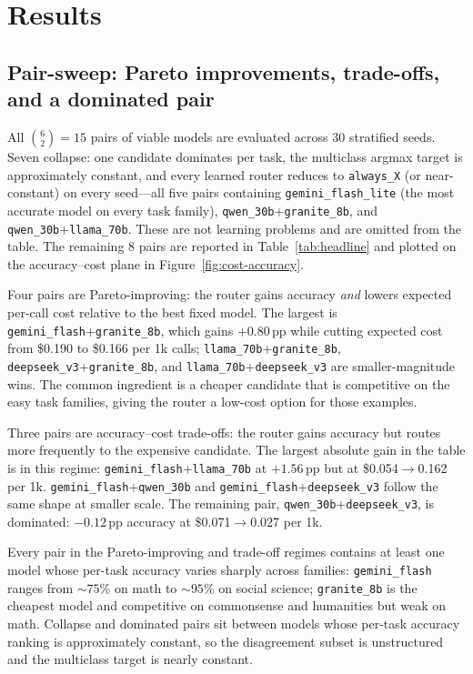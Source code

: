 \documentclass[11pt]{article}
\begin{document}
\section{Results}

\subsection{Pair-sweep: Pareto improvements, trade-offs, and a dominated pair}
\label{sec:pair-sweep}
All $\binom{6}{2}=15$ pairs of viable models are evaluated across 30 stratified seeds. Seven collapse: one candidate dominates per task, the multiclass argmax target is approximately constant, and every learned router reduces to \texttt{always\_X} (or near-constant) on every seed---all five pairs containing \texttt{gemini\_flash\_lite} (the most accurate model on every task family), \texttt{qwen\_30b}+\texttt{granite\_8b}, and \texttt{qwen\_30b}+\texttt{llama\_70b}. These are not learning problems and are omitted from the table. The remaining 8 pairs are reported in Table~\ref{tab:headline} and plotted on the accuracy--cost plane in Figure~\ref{fig:cost-accuracy}.

Four pairs are Pareto-improving: the router gains accuracy \emph{and} lowers expected per-call cost relative to the best fixed model. The largest is \texttt{gemini\_flash}+\texttt{granite\_8b}, which gains $+0.80$\,pp while cutting expected cost from \$0.190 to \$0.166 per 1k calls; \texttt{llama\_70b}+\texttt{granite\_8b}, \texttt{deepseek\_v3}+\texttt{granite\_8b}, and \texttt{llama\_70b}+\texttt{deepseek\_v3} are smaller-magnitude wins. The common ingredient is a cheaper candidate that is competitive on the easy task families, giving the router a low-cost option for those examples.

Three pairs are accuracy--cost trade-offs: the router gains accuracy but routes more frequently to the expensive candidate. The largest absolute gain in the table is in this regime: \texttt{gemini\_flash}+\texttt{llama\_70b} at $+1.56$\,pp but at \$0.054$\to$0.162 per 1k. \texttt{gemini\_flash}+\texttt{qwen\_30b} and \texttt{gemini\_flash}+\texttt{deepseek\_v3} follow the same shape at smaller scale. The remaining pair, \texttt{qwen\_30b}+\texttt{deepseek\_v3}, is dominated: $-0.12$\,pp accuracy at \$0.071$\to$0.027 per 1k.

Every pair in the Pareto-improving and trade-off regimes contains at least one model whose per-task accuracy varies sharply across families: \texttt{gemini\_flash} ranges from $\sim 75\%$ on math to $\sim 95\%$ on social science; \texttt{granite\_8b} is the cheapest model and competitive on commonsense and humanities but weak on math. Collapse and dominated pairs sit between models whose per-task accuracy ranking is approximately constant, so the disagreement subset is unstructured and the multiclass target is nearly constant.
\end{document}
